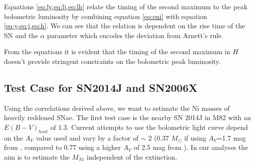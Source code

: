 Equations \eqref{eq:ly,eq:lj,eq:lh} relate the timing of the second maximum to the peak bolometric luminosity by combining equation \eqref{eq:eni} with equation \eqref{eq:y,eq:j,eq:h}. We can see that the relation is dependent on the rise time of the SN and the $\alpha$ parameter which encodes the deviation from Arnett's rule.

From the equations it is evident that the timing of the second maximum in $H$ doesn't provide stringent constraints on the bolometric peak luminosity.



\subsection{Test Case for SN2014J and SN2006X}
Using the correlations derived above, we want to estimate the Ni masses of heavily reddened SNae. The first test case is the nearby SN 2014J in M82 with an $E(B-V)_{host}$ of 1.3. 
Current attempts to use the bolometric light curve depend on the $A_V$ value used and vary by a factor of $\sim$ 2
 (0.37 $M_{\odot}$ if using $A_V$=1.7 mag from \citet{Margutti2014}, compared to 0.77 using a higher $A_V$ of 2.5 mag from \citet{Goobar2014}).  In our analyses the aim is to 
 estimate the $M_{Ni}$ independent of the extinction.

